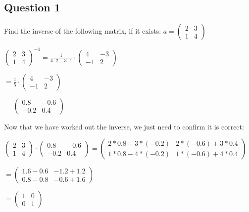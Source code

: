 \documentclass[options]{article}
\begin{document}
\subsection{Question 1}
Find the inverse of the following matrix, if it exists: \( a = \begin{pmatrix} 2 & 3\\1 & 4 \end{pmatrix} \)
\begin{center}
    \( 
        \begin{pmatrix} 
            2 & 3\\1 & 4 
        \end{pmatrix}^{-1} 
        = \frac{1}{4 
            \cdot 2 - 3 
            \cdot 1} 
            \cdot 
        \begin{pmatrix}
            4 & -3\\-1 & 2
        \end{pmatrix}
    \)

    \(
        = 
        \frac{1}{5}
        \cdot
        \begin{pmatrix}
            4 & -3\\
            -1 & 2
        \end{pmatrix}
    \)
    
    \(
        = \begin{pmatrix}
            0.8 & -0.6\\
            -0.2 & 0.4
        \end{pmatrix}
    \)
\end{center}
Now that we have worked out the inverse, we just need to confirm it is correct:
\begin{center}
    \(
        \begin{pmatrix}
            2 & 3\\
            1 & 4
        \end{pmatrix}
        \cdot
        \begin{pmatrix}
            0.8 & -0.6\\
            -0.2 & 0.4
        \end{pmatrix}
        =
        \begin{pmatrix}
            2 * 0.8 - 3 * (-0.2) & 2 * (-0.6) + 3 * 0.4\\
            1 * 0.8 - 4 * (-0.2) & 1 * (-0.6) + 4 * 0.4
        \end{pmatrix}
    \)

    \(
        = 
        \begin{pmatrix}
            1.6 - 0.6 & -1.2 + 1.2\\
            0.8 - 0.8 & -0.6 + 1.6
        \end{pmatrix}
    \)

    \(
        =
        \begin{pmatrix}
            1 & 0\\
            0 & 1
        \end{pmatrix}
    \)
\end{center}
\end{document}
